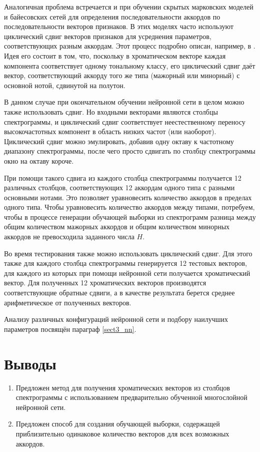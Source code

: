 Аналогичная проблема встречается и при обучении скрытых марковских моделей и
байесовских сетей для определения последовательности аккордов по
последовательности векторов признаков. В этих моделях часто используют
циклический сдвиг векторов признаков для усреднения параметров, соответствующих
разным аккордам. Этот процесс подробно описан, например, в \cite{Sheh2003}. Идея
его состоит в том, что, поскольку в хроматическом векторе каждая компонента
соответствует одному тональному классу, его циклический сдвиг даёт вектор,
соответствующий аккорду того же типа (мажорный или минорный) с основной нотой,
сдвинутой на полутон.

В данном случае при окончательном обучении нейронной сети в целом можно также
использовать сдвиг. Но входными векторами являются столбцы спектрограммы, и
циклический сдвиг соответствует неестественному переносу высокочастотных
компонент в область низких частот (или наоборот). Циклический сдвиг можно
эмулировать, добавив одну октаву к частотному диапазону спектрограммы, после
чего просто сдвигать по столбцу спектрограммы окно на октаву короче.

При помощи такого сдвига из каждого столбца спектрограммы получается 12
различных столбцов, соответствующих 12 аккордам одного типа с разными основными
нотами. Это позволяет уравновесить количество аккордов в пределах одного типа.
Чтобы уравновесить количество аккордов между типами, потребуем, чтобы в процессе
генерации обучающей выборки из спектрограмм разница между общим количеством
мажорных аккордов и общим количеством минорных аккордов не превосходила
заданного числа $H$.

Во время тестирования также можно использовать циклический сдвиг. Для этого
также для каждого столбца спектрограммы генерируется 12 тестовых векторов, для
каждого из которых при помощи нейронной сети получается хроматический вектор.
Для полученных 12 хроматических векторов производятся соответствующие обратные
сдвиги, а в качестве результата берется среднее арифметическое от полученных
векторов.

Анализу различных конфигураций нейронной сети и подбору наилучших параметров
посвящён параграф \ref{sect3_nn}.

\section{Выводы}

\begin{enumerate}
  \item Предложен метод для получения хроматических векторов из столбцов
  спектрограммы с использованием предварительно обученной многослойной нейронной
  сети.
  \item Предложен способ для создания обучающей выборки, содержащей
  приблизительно одинаковое количество векторов для всех возможных аккордов.
\end{enumerate}

